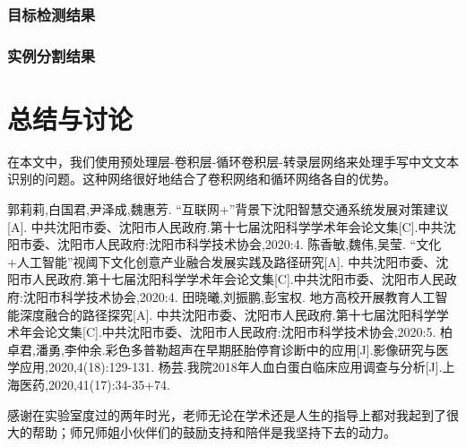 \documentclass[winfonts]{njuthesis}
\begin{document}
\subsection{目标检测结果}

\subsection{实例分割结果}




\chapter{总结与讨论}
在本文中，我们使用预处理层-卷积层-循环卷积层-转录层网络来处理手写中文文本识别的问题。这种网络很好地结合了卷积网络和循环网络各自的优势。

%
%

\begin{thebibliography}{99}  

郭莉莉,白国君,尹泽成,魏惠芳. “互联网+”背景下沈阳智慧交通系统发展对策建议[A]. 中共沈阳市委、沈阳市人民政府.第十七届沈阳科学学术年会论文集[C].中共沈阳市委、沈阳市人民政府:沈阳市科学技术协会,2020:4.
陈香敏,魏伟,吴莹. “文化+人工智能”视阈下文化创意产业融合发展实践及路径研究[A]. 中共沈阳市委、沈阳市人民政府.第十七届沈阳科学学术年会论文集[C].中共沈阳市委、沈阳市人民政府:沈阳市科学技术协会,2020:4.
田晓曦,刘振鹏,彭宝权. 地方高校开展教育人工智能深度融合的路径探究[A]. 中共沈阳市委、沈阳市人民政府.第十七届沈阳科学学术年会论文集[C].中共沈阳市委、沈阳市人民政府:沈阳市科学技术协会,2020:5.
柏卓君,潘勇,李仲余.彩色多普勒超声在早期胚胎停育诊断中的应用[J].影像研究与医学应用,2020,4(18):129-131.
杨芸.我院2018年人血白蛋白临床应用调查与分析[J].上海医药,2020,41(17):34-35+74.

\end{thebibliography} 



\begin{acknowledgement}
感谢在实验室度过的两年时光，老师无论在学术还是人生的指导上都对我起到了很大的帮助；师兄师姐小伙伴们的鼓励支持和陪伴是我坚持下去的动力。
\end{acknowledgement}

\end{document}
